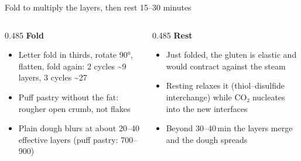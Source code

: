 \documentclass[aspectratio=169,11pt]{beamer}
\begin{document}
\begin{frame}{Fold to multiply the layers, then rest 15--30 minutes}
  \begin{columns}[T,onlytextwidth]
    \begin{column}{0.485\textwidth}
      \textbf{\color{crust}Fold}\par\small
      \begin{itemize}\setlength{\itemsep}{0.2em}
        \item Letter fold in thirds, rotate 90°, flatten, fold again: 2
          cycles \textasciitilde9 layers, 3 cycles \textasciitilde27
        \item Puff pastry without the fat: rougher open crumb, not flakes
        \item Plain dough blurs at about 20--40 effective layers (puff
          pastry: 700--900)
      \end{itemize}
    \end{column}
    \begin{column}{0.485\textwidth}
      \textbf{\color{crust}Rest}\par\small
      \begin{itemize}\setlength{\itemsep}{0.2em}
        \item Just folded, the gluten is elastic and would contract against
          the steam
        \item Resting relaxes it (thiol--disulfide interchange) while CO₂
          nucleates into the new interfaces
        \item Beyond 30--40\,min the layers merge and the dough spreads
      \end{itemize}
    \end{column}
  \end{columns}
\end{frame}
\end{document}

